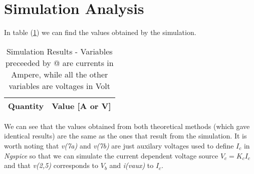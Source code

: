 \section{Simulation Analysis}
\label{sec:simulation}

In table (\ref{tab:sim}) we can find the values obtained by the simulation.

\begin{table}[H]
    \centering
    \begin{tabular}{|l|r|}
    \hline    
    {\bf Quantity} & {\bf Value [A or V]} \\ \hline
    
    \end{tabular}
    \caption{Simulation Results - Variables preceeded by @ are currents in Ampere, while 
    all the other variables are voltages in Volt}
    \label{tab:sim}
\end{table} 

We can see that the values obtained from both theoretical 
methods (which gave identical results) are the same as the ones that result from the simulation.
It is worth noting that \emph{v(7a)} and \emph{v(7b)} are just auxilary voltages used to define $I_c$
in \emph{Ngspice} so that we can simulate the current dependent voltage source $V_c = K_c I_c$ and that
\emph{v(2,5)} corresponds to $V_b$ and \emph{i(vaux)} to $I_c$.